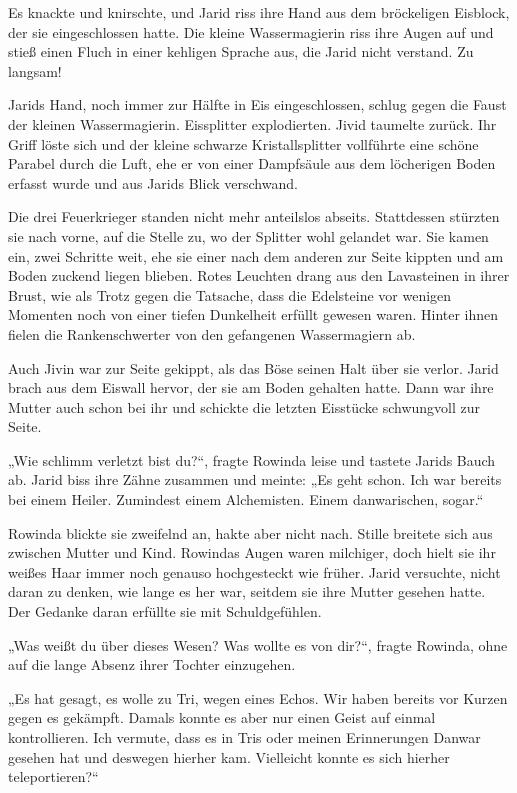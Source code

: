 Es knackte und knirschte, und Jarid riss ihre Hand aus dem bröckeligen Eisblock, der sie eingeschlossen hatte. Die kleine Wassermagierin riss ihre Augen auf und stieß einen Fluch in einer kehligen Sprache aus, die Jarid nicht verstand. Zu langsam!

Jarids Hand, noch immer zur Hälfte in Eis eingeschlossen, schlug gegen die Faust der kleinen Wassermagierin. Eissplitter explodierten. Jivid taumelte zurück. Ihr Griff löste sich und der kleine schwarze Kristallsplitter vollführte eine schöne Parabel durch die Luft, ehe er von einer Dampfsäule aus dem löcherigen Boden erfasst wurde und aus Jarids Blick verschwand.

Die drei Feuerkrieger standen nicht mehr anteilslos abseits. Stattdessen stürzten sie nach vorne, auf die Stelle zu, wo der Splitter wohl gelandet war. Sie kamen ein, zwei Schritte weit, ehe sie einer nach dem anderen zur Seite kippten und am Boden zuckend liegen blieben. Rotes Leuchten drang aus den Lavasteinen in ihrer Brust, wie als Trotz gegen die Tatsache, dass die Edelsteine vor wenigen Momenten noch von einer tiefen Dunkelheit erfüllt gewesen waren. Hinter ihnen fielen die Rankenschwerter von den gefangenen Wassermagiern ab.

Auch Jivin war zur Seite gekippt, als das Böse seinen Halt über sie verlor. Jarid brach aus dem Eiswall hervor, der sie am Boden gehalten hatte. Dann war ihre Mutter auch schon bei ihr und schickte die letzten Eisstücke schwungvoll zur Seite.

„Wie schlimm verletzt bist du?“, fragte Rowinda leise und tastete Jarids Bauch ab. Jarid biss ihre Zähne zusammen und meinte: „Es geht schon. Ich war bereits bei einem Heiler. Zumindest einem Alchemisten. Einem danwarischen, sogar.“

Rowinda blickte sie zweifelnd an, hakte aber nicht nach. Stille breitete sich aus zwischen Mutter und Kind. Rowindas Augen waren milchiger, doch hielt sie ihr weißes Haar immer noch genauso hochgesteckt wie früher. Jarid versuchte, nicht daran zu denken, wie lange es her war, seitdem sie ihre Mutter gesehen hatte. Der Gedanke daran erfüllte sie mit Schuldgefühlen.

„Was weißt du über dieses Wesen? Was wollte es von dir?“, fragte Rowinda, ohne auf die lange Absenz ihrer Tochter einzugehen.

„Es hat gesagt, es wolle zu Tri, wegen eines Echos. Wir haben bereits vor Kurzen gegen es gekämpft. Damals konnte es aber nur einen Geist auf einmal kontrollieren. Ich vermute, dass es in Tris oder meinen Erinnerungen Danwar gesehen hat und deswegen hierher kam. Vielleicht konnte es sich hierher teleportieren?“

